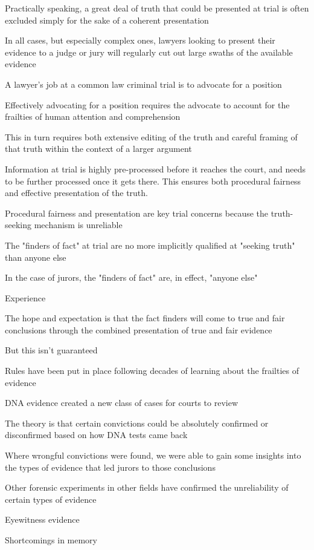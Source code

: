 Practically speaking, a great deal of truth that could be presented at trial is often excluded simply for the sake of a coherent presentation

In all cases, but especially complex ones, lawyers looking to present their evidence to a judge or jury will regularly cut out large swaths of the available evidence

A lawyer's job at a common law criminal trial is to advocate for a position

Effectively advocating for a position requires the advocate to account for the frailties of human attention and comprehension

This in turn requires both extensive editing of the truth and careful framing of that truth within the context of a larger argument

Information at trial is highly pre-processed before it reaches the court, and needs to be further processed once it gets there. This ensures both procedural fairness and effective presentation of the truth.

Procedural fairness and presentation are key trial concerns because the truth-seeking mechanism is unreliable

The "finders of fact" at trial are no more implicitly qualified at "seeking truth" than anyone else

In the case of jurors, the "finders of fact" are, in effect, "anyone else"

Experience

The hope and expectation is that the fact finders will come to true and fair conclusions through the combined presentation of true and fair evidence

But this isn't guaranteed

Rules have been put in place following decades of learning about the frailties of evidence

DNA evidence created a new class of cases for courts to review

The theory is that certain convictions could be absolutely confirmed or disconfirmed based on how DNA tests came back

Where wrongful convictions were found, we were able to gain some insights into the types of evidence that led jurors to those conclusions

Other forensic experiments in other fields have confirmed the unreliability of certain types of evidence

Eyewitness evidence

Shortcomings in memory

